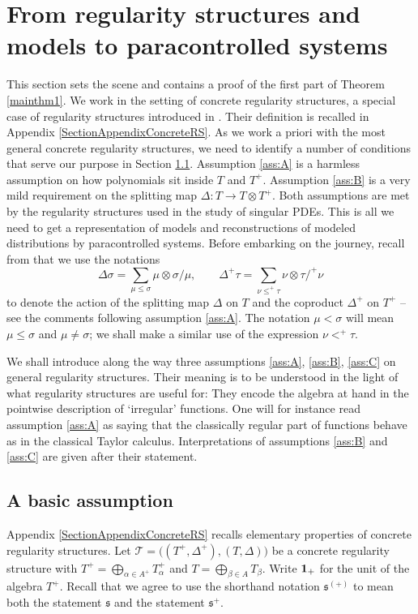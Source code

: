 \documentclass[10pt]{amsart}
\theoremstyle{plain}
\theoremstyle{definition}
\newcommand{\scrT}{\mathscr{T}}
\newcommand{\frks}{\mathfrak{s}}
\begin{document}
\section{From regularity structures and models to paracontrolled systems}
\label{SectionRStoPC}

This section sets the scene and contains a proof of the first part of Theorem \ref{mainthm1}. We work in the setting of concrete regularity structures, a special case of regularity structures introduced in \cite{BH}. Their definition is recalled in Appendix \ref{SectionAppendixConcreteRS}. As we work a priori with the most general concrete regularity structures, we need to identify a number of conditions that serve our purpose in Section \ref{SubsectionBasicAssump}. Assumption \eqref{ass:A} is a harmless assumption on how polynomials sit inside $T$ and $T^+$. Assumption \eqref{ass:B} is a very mild requirement on the splitting map $\Delta : T\to T\otimes T^+$. Both assumptions are met by the regularity structures used in the study of singular PDEs. This is all we need to get a representation of models and reconstructions of modeled distributions by paracontrolled systems. Before embarking on the journey, recall from \cite{BH} that we use the notations
\[
\Delta\sigma = \sum_{\mu\leq\sigma} \mu\otimes\sigma/\mu, \qquad \Delta^+\tau = \sum_{\nu\leq^+\tau} \nu\otimes\tau/^+\nu
\]
to denote the action of the splitting map $\Delta$ on $T$ and the coproduct $\Delta^+$ on $T^+$ -- see the comments following assumption \eqref{ass:A}. The notation $\mu<\sigma$ will mean $\mu\leq \sigma$ and $\mu\neq\sigma$; we shall make a similar use of the expression $\nu<^+\tau$.

We shall introduce along the way three assumptions \eqref{ass:A}, \eqref{ass:B}, \eqref{ass:C} on general regularity structures. Their meaning is to be understood in the light of what regularity structures are useful for: They encode the algebra at hand in the pointwise description of `irregular' functions. One will for instance read assumption \eqref{ass:A} as saying that the classically regular part of functions behave as in the classical Taylor calculus. Interpretations of assumptions \eqref{ass:B} and \eqref{ass:C} are given after their statement.

\subsection{A basic assumption}
\label{SubsectionBasicAssump}

Appendix \ref{SectionAppendixConcreteRS} recalls elementary properties of concrete regularity structures. Let $\scrT=\bigl((T^+,\Delta^+),(T,\Delta)\bigr)$ be a concrete regularity structure with $T^+ = \bigoplus_{\alpha\in A^+}T_\alpha^+$ and $T=\bigoplus_{\beta\in A} T_\beta$. Write ${\bf 1}_+$ for the unit of the algebra $T^+$. Recall that we agree to use the shorthand notation $\frks^{(+)}$ to mean both the statement $\frks$ and the statement $\frks^+$.
\end{document}
